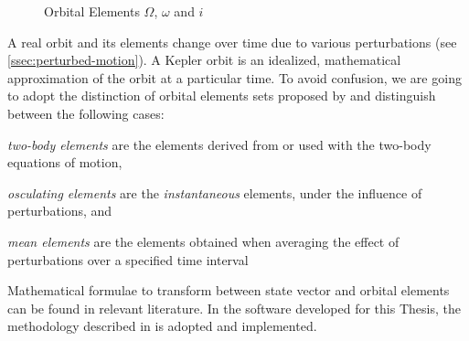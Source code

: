 \begin{figure}
  \centering
  
  \caption{Orbital Elements $\Omega$, $\omega$ and $i$}
  \label{fig:orbital-elements-Ooi}
\end{figure}

A real orbit and its elements change over time due to various perturbations (see 
\autoref{ssec:perturbed-motion}). A Kepler orbit is an idealized, mathematical 
approximation of the orbit at a particular time. To avoid confusion, we are going 
to adopt the distinction of orbital elements sets proposed by \cite{Vallado2001} and 
distinguish between the following cases:
\begin{description}
  \item \emph{two-body elements} are the elements derived from or used with 
    the two-body equations of motion,
  \item \emph{osculating elements} are the \emph{instantaneous} elements, under 
    the influence of perturbations, and
  \item \emph{mean elements} are the elements obtained when averaging the 
    effect of perturbations over a specified time interval
\end{description}

Mathematical formulae to transform between state vector and orbital elements can 
be found in relevant literature. In the software developed for this Thesis, the 
methodology described in \cite{Montenbruck2000} is adopted and implemented.
